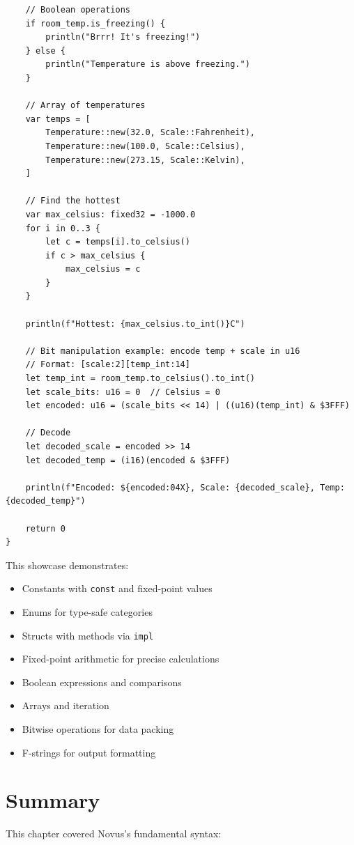 \begin{lstlisting}
    // Boolean operations
    if room_temp.is_freezing() {
        println("Brrr! It's freezing!")
    } else {
        println("Temperature is above freezing.")
    }

    // Array of temperatures
    var temps = [
        Temperature::new(32.0, Scale::Fahrenheit),
        Temperature::new(100.0, Scale::Celsius),
        Temperature::new(273.15, Scale::Kelvin),
    ]

    // Find the hottest
    var max_celsius: fixed32 = -1000.0
    for i in 0..3 {
        let c = temps[i].to_celsius()
        if c > max_celsius {
            max_celsius = c
        }
    }

    println(f"Hottest: {max_celsius.to_int()}C")

    // Bit manipulation example: encode temp + scale in u16
    // Format: [scale:2][temp_int:14]
    let temp_int = room_temp.to_celsius().to_int()
    let scale_bits: u16 = 0  // Celsius = 0
    let encoded: u16 = (scale_bits << 14) | ((u16)(temp_int) & $3FFF)

    // Decode
    let decoded_scale = encoded >> 14
    let decoded_temp = (i16)(encoded & $3FFF)

    println(f"Encoded: ${encoded:04X}, Scale: {decoded_scale}, Temp: {decoded_temp}")

    return 0
}
\end{lstlisting}

This showcase demonstrates:
\begin{itemize}
    \item Constants with \texttt{const} and fixed-point values
    \item Enums for type-safe categories
    \item Structs with methods via \texttt{impl}
    \item Fixed-point arithmetic for precise calculations
    \item Boolean expressions and comparisons
    \item Arrays and iteration
    \item Bitwise operations for data packing
    \item F-strings for output formatting
\end{itemize}

\section{Summary}

This chapter covered Novus's fundamental syntax:

